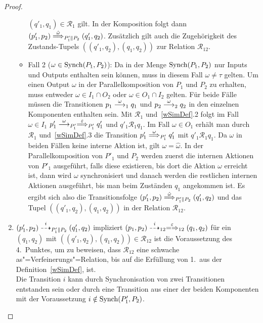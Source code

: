 \begin{proof}
\begin{enumerate}
\begin{itemize}
          $(q'_1,q_1)\in\mathcal{R}_1$ gilt. In der Komposition folgt dann
          $(p'_1,p_2) \weakmust[\hat{\omega}]_{P'_1\|P_2} (q'_1,q_2)$.
          Zusätzlich gilt auch die Zugehörigkeit des Zustands-Tupels
          $((q'_1,q_2),(q_1,q_2))$ zur Relation $\mathcal{R}_{12}$.
        \item Fall 2 ($\omega\in\mathrm{Synch} (P_1,P_2)$): Da in der Menge $\mathrm{Synch}
          (P_1,P_2)$ nur Inputs und Outputs enthalten sein können, muss in
          diesem Fall $\omega\neq\tau$ gelten. Um einen Output $\omega$ in der
          Parallelkomposition von $P_1$ und $P_2$ zu erhalten, muss entweder
          $\omega\in I_1\cap O_2$ oder $\omega\in O_1\cap I_2$ gelten. Für
          beide Fälle müssen die Transitionen $p_1\must[\omega]_1 q_1$ und
          $p_2\must[\omega]_2 q_2$ in den einzelnen Komponenten enthalten sein.
          Mit $\mathcal{R}_1$ und~\ref{wSimDef}.2 folgt im Fall $\omega\in
          I_1$ $p'_1\must[\omega]_{P'_1} \weakmust[\varepsilon]_{P'_1} q'_1$
          und $q'_1\mathcal{R}_1 q_1$. Im Fall $\omega\in O_1$ erhält man durch
          $\mathcal{R}_1$ und~\ref{wSimDef}.3 die Transition $p'_1
          \weakmust[\omega]_{P'_1} q'_1$ mit $q'_1\mathcal{R}_1 q_1$. Da
          $\omega$ in beiden Fällen keine interne Aktion ist, gilt $\omega
          =\hat{\omega}$. In der Parallelkomposition von $P'_1$ und $P_2$
          werden zuerst die internen Aktionen von $P'_1$ ausgeführt, falls
          diese existieren, bis dort die Aktion $\omega$ erreicht ist, dann
          wird $\omega$ synchronisiert und danach werden die restlichen
          internen Aktionen ausgeführt, bis man beim Zuständen $q_1$ angekommen
          ist. Es ergibt sich also die Transitionsfolge $(p'_1,p_2)
          \weakmust[\hat{\omega}]_{P'_1\|P_2} (q'_1,q_2)$ und das Tupel
          $((q'_1,q_2),(q_1,q_2))$ in der Relation $\mathcal{R}_{12}$.
      \end{itemize}
    \item $(p'_1,p_2)\may[i]_{P'_1\|P_2}(q'_1,q_2)$ impliziert $(p_1,p_2)
      \may[i]_{12} \weakmay[\varepsilon]_{12} (q_1,q_2)$ für ein $(q_1,q_2)$
      mit $((q'_1,q_2),(q_1,q_2))\in\mathcal{R}_{12}$ ist die Voraussetzung
      des 4.\ Punktes, um zu beweisen, dass $\mathcal{R}_{12}$ eine schwache
      as"=Verfeinerungs"=Relation, bis auf die Erfüllung von 1.\ aus der
      Definition~\ref{wSimDef}, ist.\\
      Die Transition $i$ kann durch Synchronisation von zwei
      Transitionen entstanden sein oder durch eine Transition aus einer der
      beiden Komponenten mit der Voraussetzung $i\notin\mathrm{Synch} (P'_1,P_2)$.

\end{enumerate}
\end{proof}
